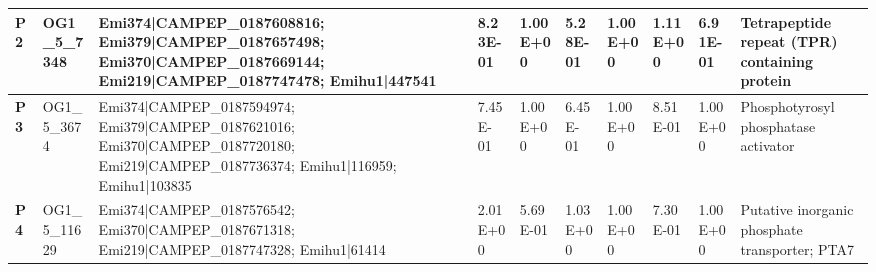 \begin{landscape}
\begin{center}
\begin{footnotesize}
\begin{longtable}{|p{0.5cm}|p{1.5cm}|p{4cm}|l|l|l|l|l|l|l|}
\textbf{P2}  & OG1\_5\_7348  & Emi374|CAMPEP\_0187608816; Emi379|CAMPEP\_0187657498; Emi370|CAMPEP\_0187669144; Emi219|CAMPEP\_0187747478; Emihu1|447541                                                                                                                                                                                                                                                                                                                                                                                                                                                                                                                & 8.23E-01  & 1.00E+00 & 5.28E-01  & 1.00E+00 & 1.11E+00  & 6.91E-01 & Tetrapeptide repeat (TPR) containing protein                                 \\ \hline
\textbf{P3}  & OG1\_5\_3674  & Emi374|CAMPEP\_0187594974; Emi379|CAMPEP\_0187621016; Emi370|CAMPEP\_0187720180; Emi219|CAMPEP\_0187736374; Emihu1|116959; Emihu1|103835                                                                                                                                                                                                                                                                                                                                                                                                                                                                                                 & 7.45E-01  & 1.00E+00 & 6.45E-01  & 1.00E+00 & 8.51E-01  & 1.00E+00 & Phosphotyrosyl phosphatase activator                                         \\ \hline
\textbf{P4}  & OG1\_5\_11629 & Emi374|CAMPEP\_0187576542; Emi370|CAMPEP\_0187671318; Emi219|CAMPEP\_0187747328; Emihu1|61414                                                                                                                                                                                                                                                                                                                                                                                                                                                                                                                                            & 2.01E+00  & 5.69E-01 & 1.03E+00  & 1.00E+00 & 7.30E-01  & 1.00E+00 & Putative inorganic phosphate transporter; PTA7                               \\ \hline

\end{longtable}
\end{footnotesize}
\end{center}
\end{landscape}

